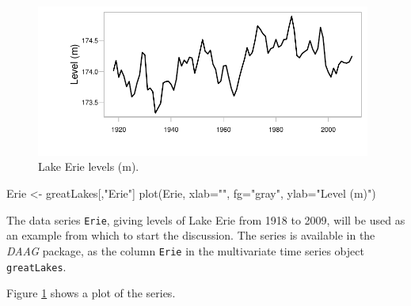 \documentclass{tufte-book}\usepackage[]{graphicx}\usepackage[]{color}
\newcommand{\txtt}[1]{\texttt{#1}}
\begin{document}
\begin{figure}
\begin{Schunk}


\centerline{\includegraphics[width=0.98\textwidth]{figs/9-Erie1-1} }

\end{Schunk}
\caption{Lake Erie levels (m).
}\label{fig:erie}
\end{figure}
\begin{marginfigure}[-7cm]
\begin{Schunk}
\begin{Sinput}
Erie <- greatLakes[,"Erie"]
plot(Erie, xlab="", fg="gray",
     ylab="Level (m)")
\end{Sinput}
\end{Schunk}
\end{marginfigure}

The data series \txtt{Erie}, giving levels of Lake Erie
from 1918 to 2009, will be used as an example from which
to start the discussion.
    The series is available in the
    \textit{DAAG} package, as the column \txtt{Erie} in the
    multivariate time series object \txtt{greatLakes}.

Figure \ref{fig:erie} shows a plot of the series.
\end{document}
